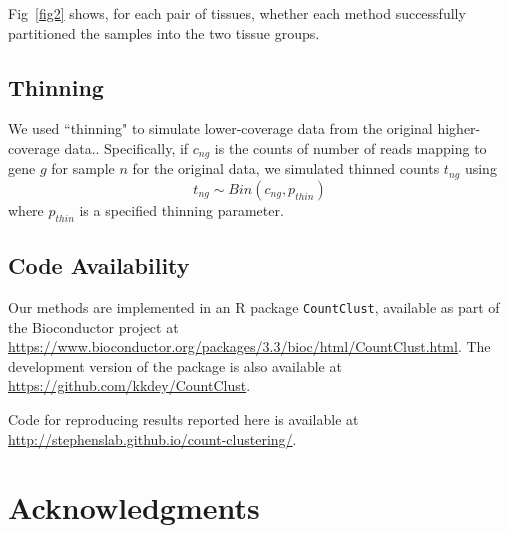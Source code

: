 \documentclass[10pt,letterpaper]{article}
\begin{document}
Fig~\ref{fig2} shows, for each pair of tissues, whether each method successfully partitioned the samples into the two tissue groups.

\subsection*{Thinning}

We used ``thinning" to simulate lower-coverage data from the original higher-coverage data..
Specifically, if $c_{ng}$ is the counts of number of reads mapping to gene $g$ for sample $n$ for the original data, we simulated
thinned counts $t_{ng}$ using
\begin{equation}
t_{ng} \sim Bin (c_{ng}, p_{thin})
\end{equation}
where $p_{thin}$ is a specified thinning parameter.


\subsection*{Code Availability}

Our methods are implemented in an R package {\tt CountClust}, available as part of the Bioconductor project at \url{https://www.bioconductor.org/packages/3.3/bioc/html/CountClust.html}. The development version of the package is also available at \url{https://github.com/kkdey/CountClust}.

Code for reproducing results reported here is available at \url{http://stephenslab.github.io/count-clustering/}.


\section*{Acknowledgments}
\end{document}
